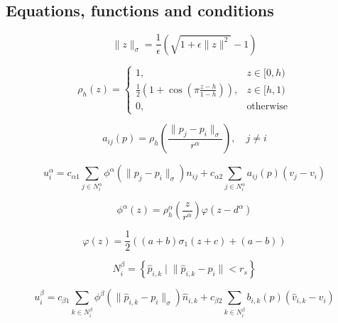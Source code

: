 \documentclass[conference]{IEEEtran}
\begin{document}
\subsection*{Equations, functions and conditions}
\begin{equation}
\| z \|_{\sigma} = \frac{1}{\epsilon} \left( \sqrt{1 + \epsilon \| z \|^2} - 1 \right)
\label{eq:16}
\end{equation}

\begin{equation}
\rho_h(z) =
\begin{cases}
1, & z \in [0, h) \\
\frac{1}{2} \left( 1 + \cos \left( \pi \frac{z - h}{1 - h} \right) \right), & z \in [h, 1) \\
0, & \text{otherwise}
\end{cases}
\label{eq:17}
\end{equation}

\begin{equation}
a_{ij}(p) = \rho_h \left( \frac{\| p_j - p_i \|_{\sigma}}{r^{\alpha}} \right), \quad j \neq i
\label{eq:18}
\end{equation}

\begin{equation}
u^{\alpha}_i = c_{\alpha 1} \sum_{j \in N^{\alpha}_i} \phi^{\alpha} \left( \| p_j - p_i \|_{\sigma} \right) n_{ij}
+ c_{\alpha 2} \sum_{j \in N^{\alpha}_i} a_{ij}(p) (v_j - v_i)
\label{eq:19}
\end{equation}

\begin{equation}
\phi^{\alpha}(z) = \rho^{\alpha}_h \left( \frac{z}{r^{\alpha}} \right) \varphi(z - d^{\alpha})
\label{eq:20}
\end{equation}

\begin{equation}
\varphi(z) = \frac{1}{2} \left( (a + b) \sigma_1(z + c) + (a - b) \right)
\label{eq:21}
\end{equation}

\begin{equation}
N^{\beta}_i = \left\{ \hat{p}_{i,k} \;\big|\; \| \hat{p}_{i,k} - p_i \| < r_s \right\}
\label{eq:22}
\end{equation}

\begin{equation}
u^{\beta}_i = c_{\beta 1} \sum_{k \in N^{\beta}_i} \phi^{\beta} \left( \| \hat{p}_{i,k} - p_i \|_{\sigma} \right) \hat{n}_{i,k}
+ c_{\beta 2} \sum_{k \in N^{\beta}_i} b_{i,k}(p) (\hat{v}_{i,k} - v_i)
\label{eq:23}
\end{equation}
\end{document}
